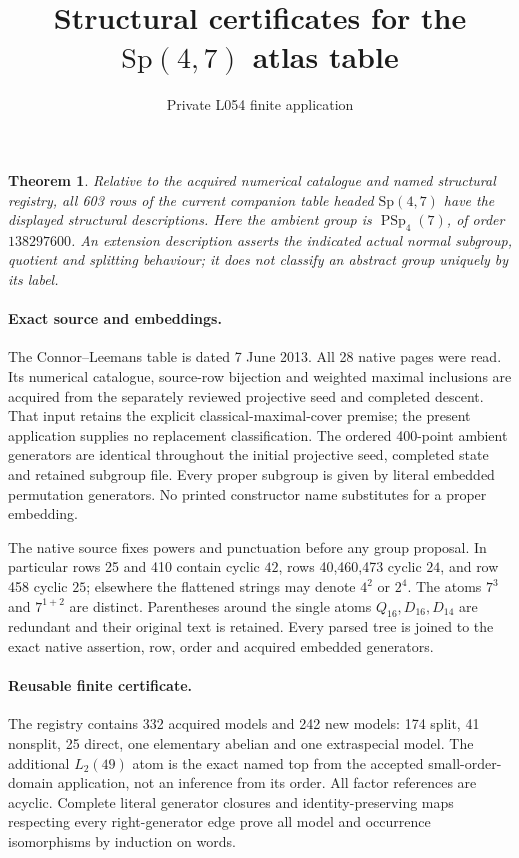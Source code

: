 \documentclass[11pt]{article}
\title{Structural certificates for the $\mathrm{Sp}(4,7)$ atlas table}
\author{Private L054 finite application}\date{}
\newtheorem{theorem}{Theorem}
\begin{document}
\maketitle
\begin{theorem}
Relative to the acquired numerical catalogue and named structural registry,
all 603 rows of the current companion table headed $\mathrm{Sp}(4,7)$ have
the displayed structural descriptions. Here the ambient group is
$\operatorname{PSp}_4(7)$, of order $138297600$. An extension description
asserts the indicated actual normal subgroup, quotient and splitting
behaviour; it does not classify an abstract group uniquely by its label.
\end{theorem}

\paragraph{Exact source and embeddings.}
The Connor--Leemans table is dated 7 June 2013. All 28 native pages were
read. Its numerical catalogue, source-row bijection and weighted maximal
inclusions are acquired from the separately reviewed projective seed and
completed descent. That input retains the explicit classical-maximal-cover
premise; the present application supplies no replacement classification.
The ordered 400-point ambient generators are identical throughout the
initial projective seed, completed state and retained subgroup file.
Every proper subgroup is given by literal embedded permutation generators.
No printed constructor name substitutes for a proper embedding.

The native source fixes powers and punctuation before any group proposal.
In particular rows 25 and 410 contain cyclic $42$, rows 40,460,473 cyclic
$24$, and row 458 cyclic $25$; elsewhere the flattened strings may denote
$4^2$ or $2^4$. The atoms $7^3$ and $7^{1+2}$ are distinct. Parentheses
around the single atoms $Q_{16},D_{16},D_{14}$ are redundant and their
original text is retained. Every parsed tree is joined to the exact native
assertion, row, order and acquired embedded generators.

\paragraph{Reusable finite certificate.}
The registry contains 332 acquired models and 242 new models: 174 split,
41 nonsplit, 25 direct, one elementary abelian and one extraspecial model.
The additional $L_2(49)$ atom is the exact named top from the accepted
small-order-domain application, not an inference from its order.
All factor references are acyclic. Complete literal generator closures
and identity-preserving maps respecting every right-generator edge prove
all model and occurrence isomorphisms by induction on words.
\end{document}
